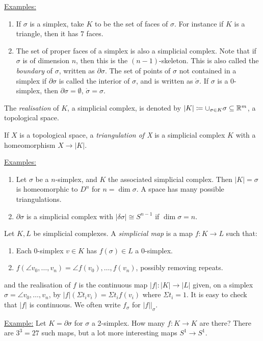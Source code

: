 \documentclass[10pt,a4paper]{article}
\begin{document}
\underline{Examples:}
\begin{enumerate}
\item If $\sigma$ is a simplex, take $K$ to be the set of faces of $\sigma$. For instance if $K$ is a triangle, then it has $7$ faces.
\item The set of proper faces of a simplex is also a simplicial complex. Note that if $\sigma$ is of dimension $n$, then this is the $(n-1)$-skeleton. This is also called the \emph{boundary} of $\sigma$, written as $\partial \sigma$. The set of points of $\sigma$ not contained in a simplex if $\partial \sigma$ is called the interior of $\sigma$, and is written as $\mathring{\sigma}$. If $\sigma$ is a $0$-simplex, then $\partial \sigma = \emptyset$, $\mathring{\sigma} = \sigma$.
\end{enumerate}

The \emph{realisation} of $K$, a simplicial complex, is denoted by $|K| \coloneqq \cup_{\sigma\in K} \sigma \subseteq \mathbb{R}^m$, a topological space.

If $X$ is a topological space, a \emph{triangulation of X} is a simplicial complex $K$ with a homeomorphism $X \to |K|$.

\underline{Examples:}
\begin{enumerate}
\item Let $\sigma$ be a $n$-simplex, and $K$ the associated simplicial complex. Then $|K| = \sigma$ is homeomorphic to $D^n$ for $n=\dim \sigma$. A space has many possible triangulations.
\item $\partial \sigma$ is a simplicial complex with $|\delta \sigma| \cong S^{n-1}$ if $\dim \sigma = n$.
\end{enumerate}
Let $K,L$ be simplicial complexes. A \emph{simplicial map} is a map $f: K \to L$ such that:
\begin{enumerate}
\item Each $0$-simplex $v \in K$ has $f(\sigma)\in L$ a $0$-simplex.
\item $f(\angle{v_0, \ldots, v_n}) = \angle{f(v_0), \ldots, f(v_n)}$, possibly removing repeats.
\end{enumerate}
and the realisation of $f$ is the continuous map $|f|:|K|\to |L|$ given, on a simplex $\sigma = \angle{v_0, \ldots, v_n}$, by $|f|(\Sigma t_i v_i) = \Sigma t_i f(v_i)$ where $\Sigma t_i = 1$. It is easy to check that $|f|$ is continuous. We often write $f_{\sigma}$ for $|f||_{\sigma}$.

\underline{Example:} Let $K = \partial\sigma$ for $\sigma$ a 2-simplex. How many $f:K \to K$ are there? There are $3^3 = 27$ such maps, but a lot more interesting maps $S^1 \to S^1$.
\end{document}
